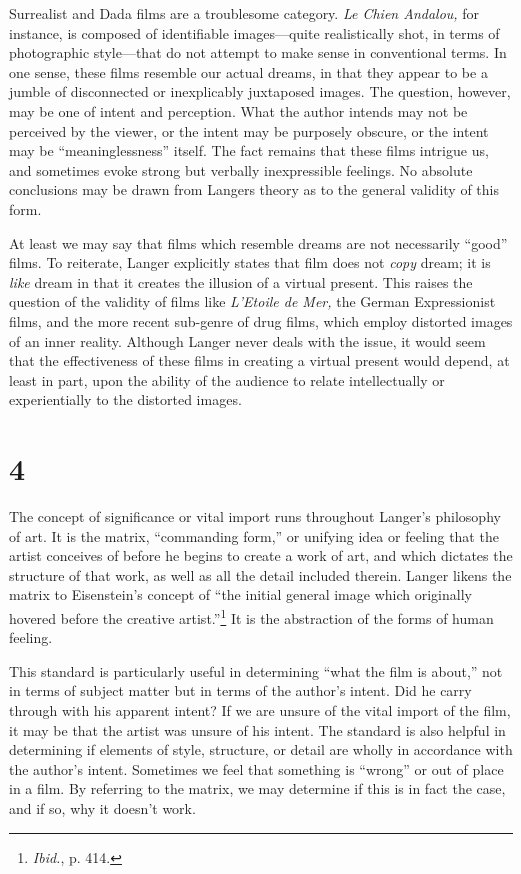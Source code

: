 \documentclass{tufte-handout}
\begin{document}
Surrealist and Dada films are a troublesome category. \emph{Le Chien
Andalou,} for instance, is composed of identifiable images---quite
realistically shot, in terms of photographic style---that do not attempt
to make sense in conven­tional terms. In one sense, these films resemble
our actual dreams, in that they appear to be a jumble of disconnected or
inexplicably juxtaposed images. The question, however, may be one of
intent and perception. What the author intends may not be perceived by
the viewer, or the intent may be purposely obscure, or the intent may be
``meaninglessness'' itself. The fact remains that these films intrigue
us, and sometimes evoke strong but verbally inexpressible feelings. No
absolute conclusions may be drawn from Langer\textquotesingle s theory
as to the general validity of this form.

At least we may say that films which resemble dreams are not necessarily
``good'' films. To reiterate, Langer explicitly states that film does
not \emph{copy} dream; it is \emph{like} dream in that it creates the
illusion of a virtual present. This raises the question of the validity
of films like \emph{L'Etoile de Mer,} the German Expressionist films,
and the more recent sub-genre of drug films, which employ distorted
images of an inner reality. Although Langer never deals with the issue,
it would seem that the effectiveness of these films in creating a
virtual present would depend, at least in part, upon the ability of the
audience to relate intellectually or experientially to the distorted
images.

\hypertarget{4}{%
\section{\textbf{4}}\label{4}}

The concept of significance or vital import runs throughout Langer's
philosophy of art. It is the matrix, ``commanding form,'' or unifying
idea or feeling that the artist conceives of before he begins to create
a work of art, and which dictates the structure of that work, as well as
all the detail in­cluded therein. Langer likens the matrix to
Eisenstein's concept of ``the initial general image which originally
hovered before the creative artist.''\footnote{\emph{Ibid.}, p. 414.} It
is the abstraction of the forms of human feeling.

This standard is particularly useful in determining ``what the film is
about,'' not in terms of subject matter but in terms of the author's
intent. Did he carry through with his apparent intent? If we are unsure
of the vital import of the film, it may be that the artist was unsure of
his intent. The standard is also helpful in determining if elements of
style, structure, or detail are wholly in accordance with the author's
intent. Sometimes we feel that something is ``wrong'' or out of place in
a film. By referring to the matrix, we may determine if this is in fact
the case, and if so, why it doesn't work.
\end{document}
